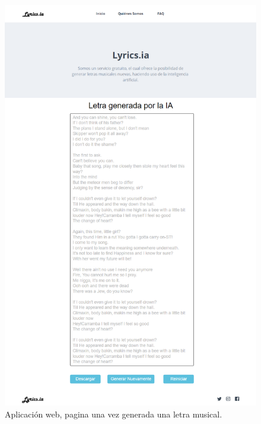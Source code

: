 \documentclass[12pt, a4paper, titlepage]{report}
\begin{document}
\begin{figure}[H] \caption{Aplicación web, pagina una vez generada una letra musical.}
	\includegraphics[width=12cm]{./imagenes/Analisis/MockFrontGenerated.png}
	\centering 
\end{figure} 
\renewcommand\appendixpagename{Anexos}
\renewcommand\appendixtocname{Anexos}
\appendixpageon
	\begin{appendices}
	\newpage
	\renewcommand*\glossaryname{{\textcolor{azulescom}{Glosario.}}}
	\printglossary
	\newpage
	\renewcommand*\glossaryname{{\textcolor{azulescom}{Acrónimos.}}}
	\printglossary[title={\textcolor{azulescom}{Acrónimos.}}, type=\acronymtype]
\end{appendices}
\end{document}
